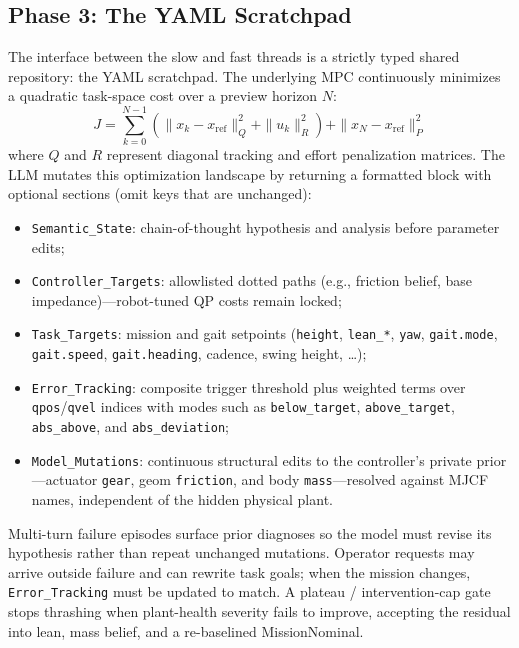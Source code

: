 \subsection{Phase 3: The YAML Scratchpad}
\label{sec:scratchpad}

The interface between the slow and fast threads is a strictly typed shared repository: the YAML scratchpad.
The underlying MPC continuously minimizes a quadratic task-space cost over a preview horizon $N$:
\begin{equation}
J = \sum_{k=0}^{N-1} \left( \| x_k - x_{\text{ref}} \|_Q^2 + \| u_k \|_R^2 \right) + \| x_N - x_{\text{ref}} \|_P^2
\label{eq:mpc_obj}
\end{equation}
where $Q$ and $R$ represent diagonal tracking and effort penalization matrices.
The LLM mutates this optimization landscape by returning a formatted block with optional sections (omit keys that are unchanged):
\begin{itemize}
\item \texttt{Semantic\_State}: chain-of-thought hypothesis and analysis before parameter edits;
\item \texttt{Controller\_Targets}: allowlisted dotted paths (e.g., friction belief, base impedance)---robot-tuned QP costs remain locked;
\item \texttt{Task\_Targets}: mission and gait setpoints (\texttt{height}, \texttt{lean\_*}, \texttt{yaw}, \texttt{gait.mode}, \texttt{gait.speed}, \texttt{gait.heading}, cadence, swing height, \ldots);
\item \texttt{Error\_Tracking}: composite trigger threshold plus weighted terms over \texttt{qpos}/\texttt{qvel} indices with modes such as \texttt{below\_target}, \texttt{above\_target}, \texttt{abs\_above}, and \texttt{abs\_deviation};
\item \texttt{Model\_Mutations}: continuous structural edits to the controller's private prior---actuator \texttt{gear}, geom \texttt{friction}, and body \texttt{mass}---resolved against MJCF names, independent of the hidden physical plant.
\end{itemize}
Multi-turn failure episodes surface prior diagnoses so the model must revise its hypothesis rather than repeat unchanged mutations.
Operator requests may arrive outside failure and can rewrite task goals; when the mission changes, \texttt{Error\_Tracking} must be updated to match.
A plateau / intervention-cap gate stops thrashing when plant-health severity fails to improve, accepting the residual into lean, mass belief, and a re-baselined MissionNominal.

